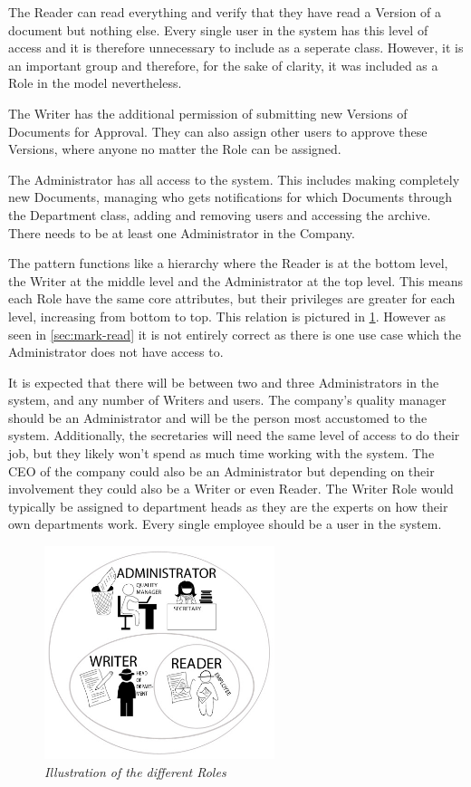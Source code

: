 \documentclass[../../master.tex]{subfiles}
\begin{document}
The Reader can read everything and verify that they have read a Version of a document but nothing else.
Every single user in the system has this level of access and it is therefore unnecessary to include as a seperate class.
However, it is an important group and therefore, for the sake of clarity, it was included as a Role in the model nevertheless.

The Writer has the additional permission of submitting new Versions of Documents for Approval. They can also assign other users to approve these Versions, where anyone no matter the Role can be assigned.

The Administrator has all access to the system.
This includes making completely new Documents, managing who gets notifications for which Documents through the Department class, adding and removing users and accessing the archive.
There needs to be at least one Administrator in the Company.

The pattern functions like a hierarchy where the Reader is at the bottom level, the Writer at the middle level and the Administrator at the top level. This means each Role have the same core attributes, but their privileges are greater for each level, increasing from bottom to top.
This relation is pictured in \cref{fig:RoleIllustration}.
However as seen in \cref{sec:mark-read} it is not entirely correct as there is one use case which the Administrator does not have access to.

It is expected that there will be between two and three Administrators in the system, and any number of Writers and users.
The company's quality manager should be an Administrator and will be the person most accustomed to the system.
Additionally, the secretaries will need the same level of access to do their job, but they likely won't spend as much time working with the system.
The CEO of the company could also be an Administrator but depending on their involvement they could also be a Writer or even Reader.
The Writer Role would typically be assigned to department heads as they are the experts on how their own departments work.
Every single employee should be a user in the system.

\begin{figure}[H]
	\centering
	\includegraphics[width=0.60\textwidth]{billeder/RP-Roller2.jpg}
	\caption{\textit{Illustration of the different Roles
	}\label{fig:RoleIllustration}}
\end{figure}
\end{document}
